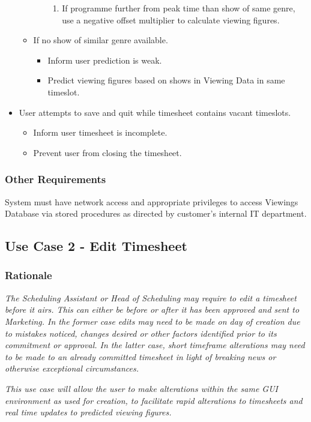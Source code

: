 \documentclass[11pt, oneside]{article}
\begin{document}
\begin{itemize}
\begin{itemize}
\begin{itemize}
\begin{enumerate}
			\item If programme further from peak time than show of same genre, use a negative offset multiplier to calculate viewing figures.
			\end{enumerate}
		\end{itemize}
	\item If no show of similar genre available.
		\begin{itemize}
		\item Inform user prediction is weak.
		\item Predict viewing figures based on shows in Viewing Data in same timeslot.
		\end{itemize}
	\end{itemize}
\item User attempts to save and quit while timesheet contains vacant timeslots.
	\begin{itemize}
	\item Inform user timesheet is incomplete.
	\item Prevent user from closing the timesheet.
	\end{itemize}
\end{itemize}
\subsubsection*{Other Requirements}
System must have network access and appropriate privileges to access Viewings Database via stored procedures as directed by customer's internal IT department.


\subsection{Use Case 2 - Edit Timesheet}
\subsubsection*{Rationale}
\textit{The Scheduling Assistant or Head of Scheduling may require to edit a timesheet before it airs. This can either be before or after it has been approved and sent to Marketing. In the former case edits may need to be made on day of creation due to mistakes noticed, changes desired or other factors identified prior to its commitment or approval. In the latter case, short timeframe alterations may need to be made to an already committed timesheet in light of breaking news or otherwise exceptional circumstances.}

\textit{This use case will allow the user to make alterations within the same GUI environment as used for creation, to facilitate rapid alterations to timesheets and real time updates to predicted viewing figures.}
\end{document}
